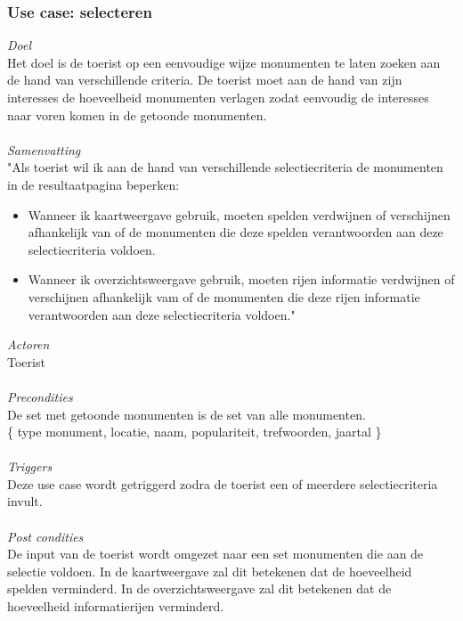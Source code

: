 \documentclass[a4paper,10pt]{article}
\begin{document}
			\subsubsection{Use case: selecteren}
			\textit{Doel}\\
			Het doel is de toerist op een eenvoudige wijze monumenten te laten zoeken aan de hand van verschillende criteria. De toerist moet aan de hand van zijn interesses de hoeveelheid monumenten verlagen zodat eenvoudig de interesses naar voren komen in de getoonde monumenten.\\ \\
			\textit{Samenvatting}\\
			"Als toerist wil ik aan de hand van verschillende selectiecriteria de monumenten in de resultaatpagina beperken:
			\begin{itemize}
				\item Wanneer ik kaartweergave gebruik, moeten spelden verdwijnen of verschijnen afhankelijk van of de monumenten die deze spelden verantwoorden aan deze selectiecriteria voldoen.
				\item Wanneer ik overzichtsweergave gebruik, moeten rijen informatie verdwijnen of verschijnen afhankelijk vam of de monumenten die deze rijen informatie verantwoorden aan deze selectiecriteria voldoen."
			\end{itemize}
			\textit{Actoren}\\
			Toerist\\ \\
			\textit{Precondities}\\
			De set met getoonde monumenten is de set van alle monumenten.\\
			\{ type monument, locatie, naam, populariteit, trefwoorden, jaartal \} \\ \\
			\textit{Triggers}\\
			Deze use case wordt getriggerd zodra de toerist een of meerdere selectiecriteria invult.\\ \\
			\textit{Post condities}\\			
			De input van de toerist wordt omgezet naar een set monumenten die aan de selectie voldoen. In de kaartweergave zal dit betekenen dat de hoeveelheid spelden verminderd. In de overzichtsweergave zal dit betekenen dat de hoeveelheid informatierijen verminderd.		
			
\end{document}
